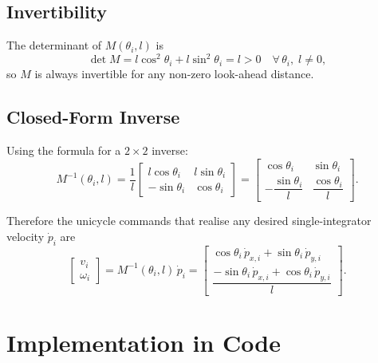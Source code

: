 \documentclass[11pt,a4paper]{article}
\newcommand{\dpdt}[1]{\dot{p}_{#1}}
\newcommand{\dpdx}[1]{\dot{p}_{x,#1}}
\newcommand{\dpdy}[1]{\dot{p}_{y,#1}}
\begin{document}
\subsection{Invertibility}

The determinant of $M(\theta_i,l)$ is
\begin{equation}
  \det M = l\cos^2\theta_i + l\sin^2\theta_i = l > 0
  \quad \forall\,\theta_i,\; l\neq 0,
\end{equation}
so $M$ is always invertible for any non-zero look-ahead distance.

\subsection{Closed-Form Inverse}

Using the formula for a $2\times 2$ inverse:
\begin{equation}\label{eq:Minv}
  M^{-1}(\theta_i,l)
  = \frac{1}{l}
    \begin{bmatrix}
      l\cos\theta_i  & l\sin\theta_i \\
      -\sin\theta_i  & \cos\theta_i
    \end{bmatrix}
  = \begin{bmatrix}
      \cos\theta_i          & \sin\theta_i \\
      -\dfrac{\sin\theta_i}{l} & \dfrac{\cos\theta_i}{l}
    \end{bmatrix}.
\end{equation}

\noindent Therefore the unicycle commands that realise any desired
single-integrator velocity $\dpdt{i}$ are
\begin{equation}\label{eq:exact_conversion}
  \boxed{
  \begin{bmatrix}v_i\\\omega_i\end{bmatrix}
  = M^{-1}(\theta_i,l)\,\dpdt{i}
  = \begin{bmatrix}
      \cos\theta_i\,\dpdx{i} + \sin\theta_i\,\dpdy{i}\\[6pt]
      \dfrac{-\sin\theta_i\,\dpdx{i} + \cos\theta_i\,\dpdy{i}}{l}
    \end{bmatrix}.}
\end{equation}

\section{Implementation in Code}
\end{document}
